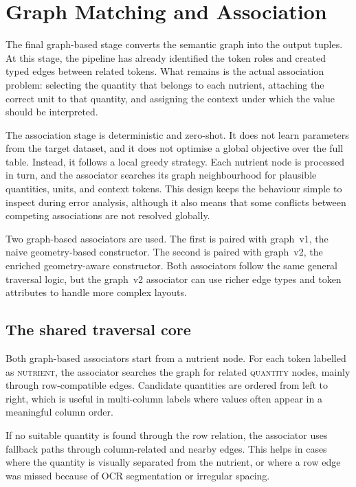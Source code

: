 \section{Graph Matching and Association}\label{sec:association}

The final graph-based stage converts the semantic graph into the output tuples. At this stage, the pipeline has already identified the token roles and created typed edges between related tokens. What remains is the actual association problem: selecting the quantity that belongs to each nutrient, attaching the correct unit to that quantity, and assigning the context under which the value should be interpreted.

The association stage is deterministic and zero-shot. It does not learn parameters from the target dataset, and it does not optimise a global objective over the full table. Instead, it follows a local greedy strategy. Each nutrient node is processed in turn, and the associator searches its graph neighbourhood for plausible quantities, units, and context tokens. This design keeps the behaviour simple to inspect during error analysis, although it also means that some conflicts between competing associations are not resolved globally.

Two graph-based associators are used. The first is paired with graph~v1, the naive geometry-based constructor. The second is paired with graph~v2, the enriched geometry-aware constructor. Both associators follow the same general traversal logic, but the graph~v2 associator can use richer edge types and token attributes to handle more complex layouts.

\subsection{The shared traversal core}\label{sec:association-core}

Both graph-based associators start from a nutrient node. For each token labelled as \textsc{nutrient}, the associator searches the graph for related \textsc{quantity} nodes, mainly through row-compatible edges. Candidate quantities are ordered from left to right, which is useful in multi-column labels where values often appear in a meaningful column order.

If no suitable quantity is found through the row relation, the associator uses fallback paths through column-related and nearby edges. This helps in cases where the quantity is visually separated from the nutrient, or where a row edge was missed because of OCR segmentation or irregular spacing.

